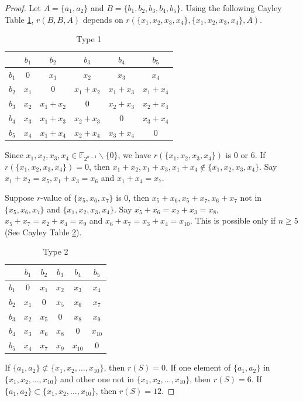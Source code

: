 \documentclass[12pt,a4paper]{article}
\begin{document}
	\begin{proof}
		Let $A=\{a_1,a_2\}$ and $B=\{b_1,b_2,b_3,b_4,b_5\}$.
		Using the following Cayley Table \ref{Type 1}, $r(B,B,A)$ depends on $r(\{x_1,x_2,x_3,x_4\},\{x_1,x_2,x_3,x_4\},A)$.	\\
		\begin{table}[h]
			\caption{Type 1}
			\label{Type 1}
			\begin{center}
				\begin{tabular}{c||c|c|c|c|c}
					
					&$b_1$ &$b_2$ &$b_3$ &$b_4$ &$b_5$ \\
					\hline
					\hline
					$b_1$ &0 &$x_1$ &$x_2$ &$x_3$ &$x_4$ \\
					\hline
					$b_2$&$x_1$ &0 &$x_1+x_2$ &$x_1+x_3$ &$x_1+x_4$ \\
					\hline
					$b_3$&$x_2$ &$x_1+x_2$ &0 &$x_2+x_3$ &$x_2+x_4$ \\
					\hline
					$b_4$&$x_3$ &$x_1+x_3$ &$x_2+x_3$ &0 &$x_3+x_4$ \\
					\hline
					$b_5$&$x_4$ &$x_1+x_4$ &$x_2+x_4$ & $x_3+x_4$&0 \\
				\end{tabular}
			\end{center}
		\end{table}
		Since  $x_1,x_2,x_3,x_4\in\mathbb{F}_{2^{n-1}}\backslash\{0\}$, we have $r(\{x_1,x_2,x_3,x_4\})$ is 0 or 6. If $r(\{x_1,x_2,x_3,x_4\})=0$, then $x_1+x_2,x_1+x_3,x_1+x_4\notin\{x_1,x_2,x_3,x_4\}$. Say $x_1+x_2=x_5,x_1+x_3=x_6$ and $x_1+x_4=x_7$.
		
		Suppose $r$-value of $\{x_5,x_6,x_7\}$ is 0, then $x_5+x_6,x_5+x_7,x_6+x_7$ not in $\{x_5,x_6,x_7\}$ and $\{x_1,x_2,x_3,x_4\}$. Say $x_5+x_6=x_2+x_3=x_8$, $x_5+x_7=x_2+x_4=x_9$ and $x_6+x_7=x_3+x_4=x_{10}$. This is possible only if $n\geq 5$ (See Cayley Table \ref{Type 2}).
		\begin{table}[h]
			\caption{Type 2}
			\label{Type 2}
			\begin{center}
				\begin{tabular}{c||c|c|c|c|c}
					
					&$b_1$ &$b_2$ &$b_3$ &$b_4$ &$b_5$ \\
					\hline
					\hline
					$b_1$ &0 &$x_1$ &$x_2$ &$x_3$ &$x_4$ \\
					\hline
					$b_2$&$x_1$ &0 &$x_5$ &$x_6$ &$x_7$ \\
					\hline
					$b_3$&$x_2$ &$x_5$ &0 &$x_8$ &$x_9$ \\
					\hline
					$b_4$&$x_3$ &$x_6$ &$x_8$ &0 &$x_{10}$ \\
					\hline
					$b_5$&$x_4$ &$x_7$ &$x_9$ & $x_{10}$&0 \\
				\end{tabular}
			\end{center}
		\end{table}
		If $\{a_1,a_2\}\not\subset\{x_1,x_2,\dots,x_{10}\}$, then $r(S)=0$. If one element of $\{a_1,a_2\}$ in $\{x_1,x_2,\dots,x_{10}\}$ and other one not in $\{x_1,x_2,\dots,x_{10}\}$, then $r(S)=6$. If $\{a_1,a_2\}\subset\{x_1,x_2,\dots,x_{10}\}$, then $r(S)=12$. 
		

\end{proof}
\end{document}
